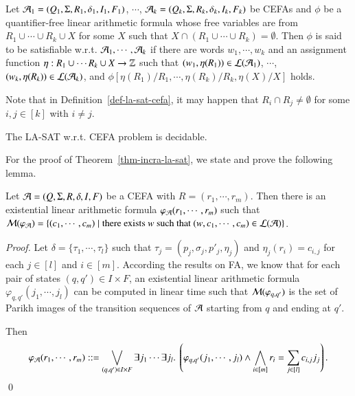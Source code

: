 
\begin{definition}\label{def-la-sat-cefa}
Let $\mathcal{A}_1=(Q_1, \Sigma, R_1, \delta_1, I_1, F_1)$, $\cdots$, $\mathcal{A}_k=(Q_k, \Sigma, R_k, \delta_k, I_k, F_k)$ be CEFAs
  and $\phi$ be a quantifier-free linear arithmetic formula whose free variables are from  $R_1 \cup \cdots \cup R_k \cup X$ for some $X$ such that $X \cap (R_1 \cup \cdots \cup R_k) = \emptyset$. Then $\phi$ is said to be satisfiable w.r.t. $\mathcal{A}_1, \cdots, \mathcal{A}_k$ if  there are words $w_1, \cdots, w_k$ and an assignment function $\eta: R_1 \cup \cdots R_k \cup X \rightarrow \mathbb{Z}$  %
 such that  $(w_1, \eta(R_1)) \in \mathcal{L}(\mathcal{A}_1)$, $ \cdots$, $(w_k, \eta(R_k)) \in \mathcal{L}(\mathcal{A}_k)$, and $\phi[\eta(R_1)/R_1, \cdots,\eta(R_k)/R_k, \eta(X)/X]$ holds.
\end{definition}
Note that in Definition~\ref{def-la-sat-cefa}, it may happen that $R_i \cap R_j \neq \emptyset$ for some $i, j \in [k]$ with $i \neq j$.

\begin{theorem}\label{thm-incra-la-sat}
The LA-SAT w.r.t. CEFA problem is decidable.
\end{theorem}

For the proof of Theorem~\ref{thm-incra-la-sat}, we state and prove the following lemma. 

\begin{lemma}\label{lem-incra-la}
Let $\mathcal{A}=(Q, \Sigma, R, \delta, I, F)$ be a CEFA with $R= (r_1, \cdots,  r_m)$. Then there is an existential linear arithmetic formula $\varphi_{\mathcal{A}}(r_1, \cdots, r_m)$ such that $\mathcal{M}(\varphi_{\mathcal{A}})= \{(c_1, \cdots, c_m) \mid \mbox{there exists } w \mbox{ such that } (w, c_1, \cdots, c_m) \in \mathcal{L}(\mathcal{A})\}$.
\end{lemma}

\begin{proof}
Let $\delta = \{\tau_1, \cdots, \tau_l\}$ such that $\tau_j = (p_j, \sigma_j, p'_j, \eta_j)$ and $\eta_j(r_i) =  c_{i,j}$ for each $j \in [l]$ and $i \in [m]$.
According the results on FA, we know that for each pair of states $(q, q') \in I \times F$,  an existential linear arithmetic formula $\varphi_{q,q'}(j_1, \cdots, j_l)$ can be computed in linear time such that $\mathcal{M}(\varphi_{q,q'})$ is the set of Parikh images of the transition sequences of $\mathcal{A}$ starting from $q$ and ending at $q'$. 

Then 
\[\varphi_\Aut(r_1, \cdots, r_m) ::= \bigvee \limits_{(q,q') \in I \times F} \exists j_1 \cdots \exists j_l.\ \left(\varphi_{q,q'}(j_1, \cdots, j_l) \wedge \bigwedge \limits_{i \in [m]} r_i = \sum \limits_{j \in [l]} c_{i,j} j_j \right).\]
\qed
\end{proof}

